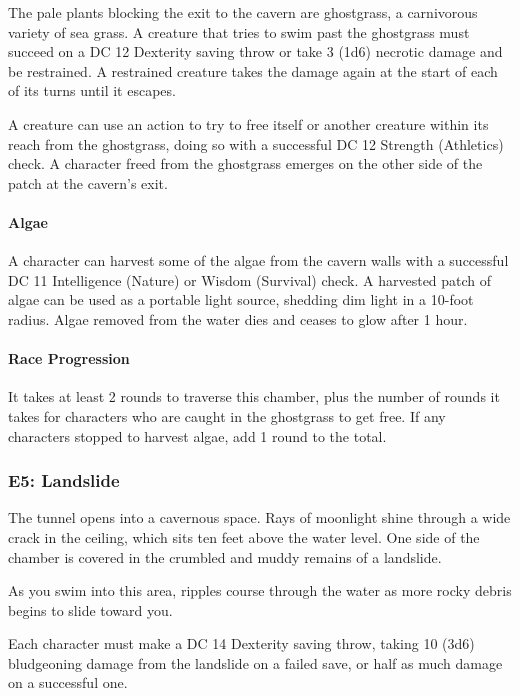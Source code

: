 \documentclass[10pt,a4paper,twoside,bg=print,twocolumn,openany,nodeprecatedcode]{dndbook}
\begin{document}
The pale plants blocking the exit to the cavern are ghostgrass, a carnivorous variety of sea grass. A creature that tries to swim past the ghostgrass must succeed on a DC 12 Dexterity saving throw or take 3 (1d6) necrotic damage and be restrained. A restrained creature takes the damage again at the start of each of its turns until it escapes.

A creature can use an action to try to free itself or another creature within its reach from the ghostgrass, doing so with a successful DC 12 Strength (Athletics) check. A character freed from the ghostgrass emerges on the other side of the patch at the cavern's exit.

\paragraph{Algae}
A character can harvest some of the algae from the cavern walls with a successful DC 11 Intelligence (Nature) or Wisdom (Survival) check. A harvested patch of algae can be used as a portable light source, shedding dim light in a 10-foot radius. Algae removed from the water dies and ceases to glow after 1 hour.

\paragraph{Race Progression}
It takes at least 2 rounds to traverse this chamber, plus the number of rounds it takes for characters who are caught in the ghostgrass to get free. If any characters stopped to harvest algae, add 1 round to the total.

\subsubsection{E5: Landslide}
\begin{DndReadAloud}{}
The tunnel opens into a cavernous space. Rays of moonlight shine through a wide crack in the ceiling, which sits ten feet above the water level. One side of the chamber is covered in the crumbled and muddy remains of a landslide.

As you swim into this area, ripples course through the water as more rocky debris begins to slide toward you.

\end{DndReadAloud}

Each character must make a DC 14 Dexterity saving throw, taking 10 (3d6) bludgeoning damage from the landslide on a failed save, or half as much damage on a successful one.
\end{document}
